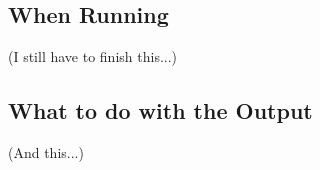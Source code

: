 \documentclass[12pt,letterpaper]{article}
\begin{document}

\subsection{When Running}

(I still have to finish this...)


\subsection{What to do with the Output}

(And this...)

\end{document}
